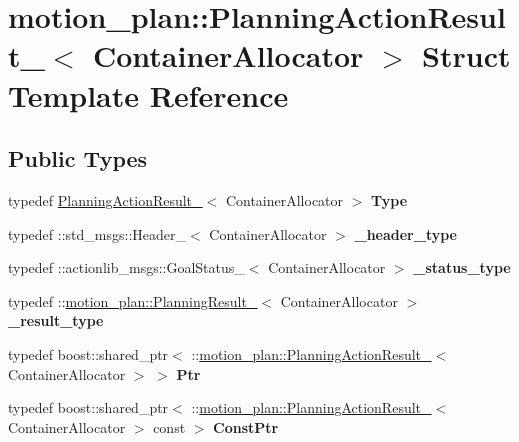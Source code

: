 \hypertarget{structmotion__plan_1_1PlanningActionResult__}{}\section{motion\+\_\+plan\+:\+:Planning\+Action\+Result\+\_\+$<$ Container\+Allocator $>$ Struct Template Reference}
\label{structmotion__plan_1_1PlanningActionResult__}
\subsection*{Public Types}
\begin{DoxyCompactItemize}
\item 
\mbox{\label{structmotion__plan_1_1PlanningActionResult___a5ba31e97607a91cb196421e9210f0a89}} 
typedef \hyperlink{structmotion__plan_1_1PlanningActionResult__}{Planning\+Action\+Result\+\_\+}$<$ Container\+Allocator $>$ {\bfseries Type}
\item 
\mbox{\label{structmotion__plan_1_1PlanningActionResult___ad084a127e015b6552b3c2482f3d7a04d}} 
typedef \+::std\+\_\+msgs\+::\+Header\+\_\+$<$ Container\+Allocator $>$ {\bfseries \+\_\+header\+\_\+type}
\item 
\mbox{\label{structmotion__plan_1_1PlanningActionResult___ab4f1c1ffb561a08a023c2ff6deeb0a43}} 
typedef \+::actionlib\+\_\+msgs\+::\+Goal\+Status\+\_\+$<$ Container\+Allocator $>$ {\bfseries \+\_\+status\+\_\+type}
\item 
\mbox{\label{structmotion__plan_1_1PlanningActionResult___ab9dfff78361a53e3ceaa8fa7cf890741}} 
typedef \+::\hyperlink{structmotion__plan_1_1PlanningResult__}{motion\+\_\+plan\+::\+Planning\+Result\+\_\+}$<$ Container\+Allocator $>$ {\bfseries \+\_\+result\+\_\+type}
\item 
\mbox{\label{structmotion__plan_1_1PlanningActionResult___a342ed7483faaeeac2fc2081ba33e4294}} 
typedef boost\+::shared\+\_\+ptr$<$ \+::\hyperlink{structmotion__plan_1_1PlanningActionResult__}{motion\+\_\+plan\+::\+Planning\+Action\+Result\+\_\+}$<$ Container\+Allocator $>$ $>$ {\bfseries Ptr}
\item 
\mbox{\label{structmotion__plan_1_1PlanningActionResult___a83d3abcb58c21ee69dc3808f05cb4203}} 
typedef boost\+::shared\+\_\+ptr$<$ \+::\hyperlink{structmotion__plan_1_1PlanningActionResult__}{motion\+\_\+plan\+::\+Planning\+Action\+Result\+\_\+}$<$ Container\+Allocator $>$ const  $>$ {\bfseries Const\+Ptr}
\end{DoxyCompactItemize}
